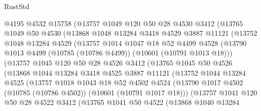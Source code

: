 \begin{lexlean}{RustStd}
\begin{coremodule}
            @4195
            @4532
            @15758
            (@13757
              @1049
              @120
              @50
              @28
              @4530
              @3412
              (@13765
                @1049
                @50
                @4530
                (@13868
                  @1048
                  @13284
                  @3418
                  @4529
                  @3887
                  @11121
                  (@13752
                    @1048
                    @13284
                    @4529
                    (@13757
                      @1014
                      @1047
                      @18
                      @52
                      @4499
                      @4528
                      (@13790 @1013 @4499 (@10785 (@10786 @4499)) (@10601 (@10791 @1013 @18)))
                      (@13757
                        @1045
                        @120
                        @50
                        @28
                        @4526
                        @3412
                        (@13765
                          @1045
                          @50
                          @4526
                          (@13868
                            @1044
                            @13284
                            @3418
                            @4525
                            @3887
                            @11121
                            (@13752
                              @1044
                              @13284
                              @4525
                              (@13757
                                @1018
                                @1043
                                @18
                                @52
                                @4502
                                @4524
                                (@13790
                                  @1017
                                  @4502
                                  (@10785 (@10786 @4502))
                                  (@10601 (@10791 @1017 @18)))
                                (@13757
                                  @1041
                                  @120
                                  @50
                                  @28
                                  @4522
                                  @3412
                                  (@13765
                                    @1041
                                    @50
                                    @4522
                                    (@13868
                                      @1040
                                      @13284

\end{coremodule}
\end{lexlean}

